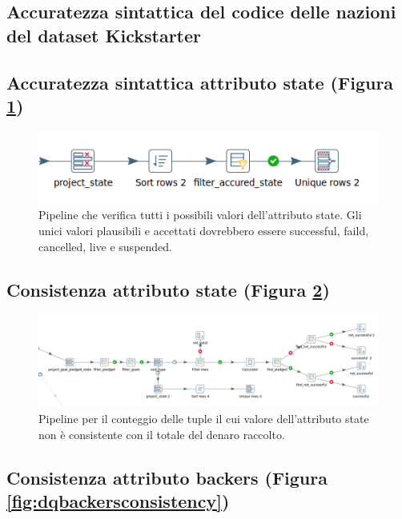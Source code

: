
\subsection{Accuratezza sintattica del codice delle nazioni del dataset Kickstarter}


\subsection{Accuratezza sintattica attributo state (Figura \ref{fig:dqstateaccuracy})}

\begin{figure}[h!]
	\centering
	\includegraphics[width=0.7\linewidth]{images/DQ_stateaccuracy}
	\caption{Pipeline che verifica tutti i possibili valori dell'attributo state. Gli unici valori plausibili e accettati dovrebbero essere successful, faild, cancelled, live e suspended.}
	\label{fig:dqstateaccuracy}
\end{figure}


\subsection{Consistenza attributo state (Figura \ref{fig:dqstateaconsistency})}

\begin{figure}[h!]
	\centering
	\includegraphics[width=0.7\linewidth]{images/DQ_stateaconsistency}
	\caption{Pipeline per il conteggio delle tuple il cui valore dell'attributo state non è consistente con il totale del denaro raccolto.}
	\label{fig:dqstateaconsistency}
\end{figure}


\subsection{Consistenza attributo backers (Figura \ref{fig:dqbackersconsistency})}

